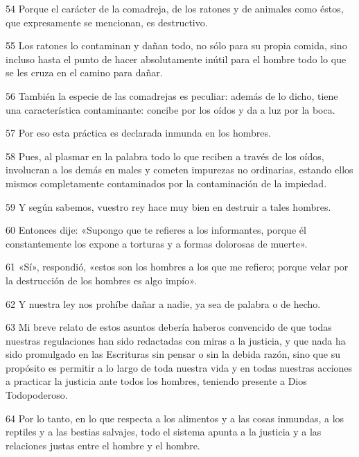 \par 54 Porque el carácter de la comadreja, de los ratones y de animales como éstos, que expresamente se mencionan, es destructivo.

\par 55 Los ratones lo contaminan y dañan todo, no sólo para su propia comida, sino incluso hasta el punto de hacer absolutamente inútil para el hombre todo lo que se les cruza en el camino para dañar.

\par 56 También la especie de las comadrejas es peculiar: además de lo dicho, tiene una característica contaminante: concibe por los oídos y da a luz por la boca.

\par 57 Por eso esta práctica es declarada inmunda en los hombres.

\par 58 Pues, al plasmar en la palabra todo lo que reciben a través de los oídos, involucran a los demás en males y cometen impurezas no ordinarias, estando ellos mismos completamente contaminados por la contaminación de la impiedad.

\par 59 Y según sabemos, vuestro rey hace muy bien en destruir a tales hombres.

\par 60 Entonces dije: «Supongo que te refieres a los informantes, porque él constantemente los expone a torturas y a formas dolorosas de muerte».

\par 61 «Sí», respondió, «estos son los hombres a los que me refiero; porque velar por la destrucción de los hombres es algo impío».

\par 62 Y nuestra ley nos prohíbe dañar a nadie, ya sea de palabra o de hecho.

\par 63 Mi breve relato de estos asuntos debería haberos convencido de que todas nuestras regulaciones han sido redactadas con miras a la justicia, y que nada ha sido promulgado en las Escrituras sin pensar o sin la debida razón, sino que su propósito es permitir a lo largo de toda nuestra vida y en todas nuestras acciones a practicar la justicia ante todos los hombres, teniendo presente a Dios Todopoderoso.

\par 64 Por lo tanto, en lo que respecta a los alimentos y a las cosas inmundas, a los reptiles y a las bestias salvajes, todo el sistema apunta a la justicia y a las relaciones justas entre el hombre y el hombre.

